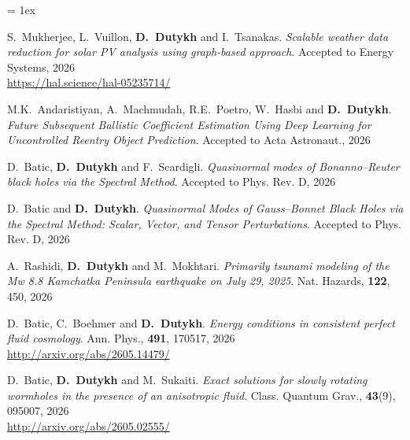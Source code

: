 \listpartsep = 1ex

\begin{etaremune}



  \item S.~Mukherjee, L.~Vuillon, \textbf{D.~Dutykh} and I.~Tsanakas. \textit{Scalable weather data reduction for solar PV analysis using graph-based approach}. Accepted to Energy Systems, 2026 \\ %
  \url{https://hal.science/hal-05235714/}

  \item M.K.~Andaristiyan, A.~Machmudah, R.E.~Poetro, W.~Hasbi and \textbf{D.~Dutykh}. \textit{Future Subsequent Ballistic Coefficient Estimation Using Deep Learning for Uncontrolled Reentry Object Prediction}. Accepted to Acta Astronaut., 2026 %

  \item D.~Batic, \textbf{D.~Dutykh} and F.~Scardigli. \textit{Quasinormal modes of Bonanno--Reuter black holes via the Spectral Method}. Accepted to Phys. Rev. D, 2026 %

  \item D.~Batic and \textbf{D.~Dutykh}. \textit{Quasinormal Modes of Gauss--Bonnet Black Holes via the Spectral Method: Scalar, Vector, and Tensor Perturbations}. Accepted to Phys. Rev. D, 2026 %

  \item A.~Rashidi, \textbf{D.~Dutykh} and M.~Mokhtari. \textit{Primarily tsunami modeling of the Mw 8.8 Kamchatka Peninsula earthquake on July 29, 2025}. Nat. Hazards, \textbf{122}, 450, 2026 %

  \item D.~Batic, C.~Boehmer and \textbf{D.~Dutykh}. \textit{Energy conditions in consistent perfect fluid cosmology}. Ann. Phys., \textbf{491}, 170517, 2026 \\ %
  \url{http://arxiv.org/abs/2605.14479/}
  
  \item D.~Batic, \textbf{D.~Dutykh} and M.~Sukaiti. \textit{Exact solutions for slowly rotating wormholes in the presence of an anisotropic fluid}. Class. Quantum Grav., \textbf{43}(9), 095007, 2026 \\ %
  \url{http://arxiv.org/abs/2605.02555/}


\end{etaremune}
